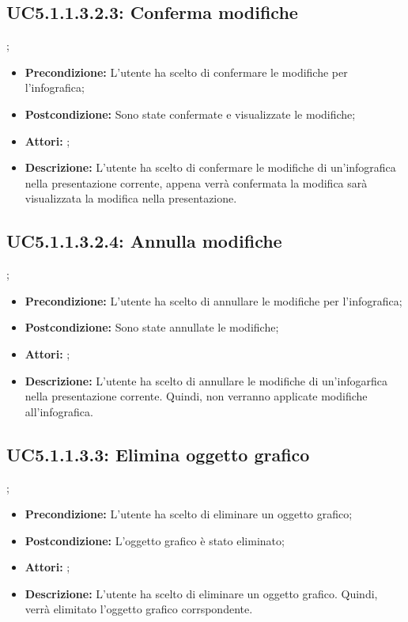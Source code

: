 \subsection{ UC5.1.1.3.2.3: Conferma modifiche}
;
\begin{itemize}
	\item \textbf{Precondizione:} L'utente ha scelto di confermare le modifiche per l'infografica;
	\item \textbf{Postcondizione:} Sono state confermate e visualizzate le modifiche;
	\item \textbf{Attori:} ;
	\item \textbf{Descrizione:} L'utente ha scelto di confermare le modifiche di un'infografica nella presentazione corrente, appena verrà confermata la modifica sarà visualizzata la modifica nella presentazione.
\end{itemize}
\subsection{ UC5.1.1.3.2.4: Annulla modifiche}
;
\begin{itemize}
	\item \textbf{Precondizione:} L'utente ha scelto di annullare le modifiche per l'infografica;
	\item \textbf{Postcondizione:} Sono state annullate le modifiche;
	\item \textbf{Attori:} ;
	\item \textbf{Descrizione:} L'utente ha scelto di annullare le modifiche di un'infogarfica nella presentazione corrente. Quindi, non verranno applicate modifiche all'infografica.
\end{itemize}
\subsection{ UC5.1.1.3.3: Elimina oggetto grafico}
;
\begin{itemize}
	\item \textbf{Precondizione:} L'utente ha scelto di eliminare un oggetto grafico;
	\item \textbf{Postcondizione:} L'oggetto grafico è stato eliminato;
	\item \textbf{Attori:} ;
	\item \textbf{Descrizione:} L'utente ha scelto di eliminare un oggetto grafico. Quindi, verrà elimitato l'oggetto grafico corrspondente.
\end{itemize}
